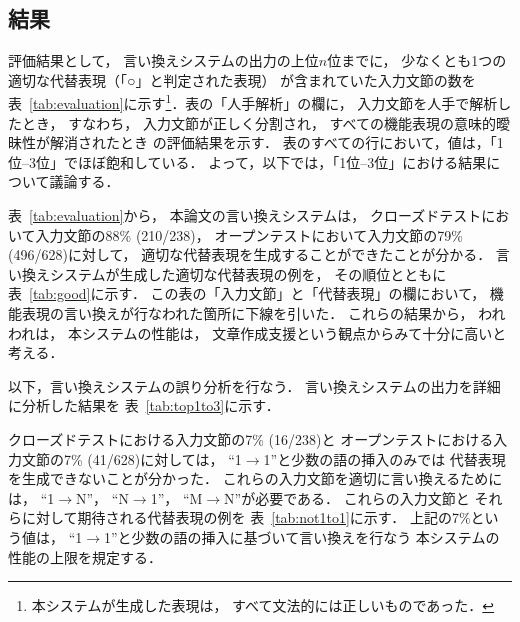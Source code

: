 \documentclass[japanese]{jnlp_1.4}
\begin{document}
\subsection{結果}

評価結果として，
言い換えシステムの出力の上位$n$位までに，
少なくとも1つの適切な代替表現（「○」と判定された表現）
が含まれていた入力文節の数を
表~\ref{tab:evaluation}に示す\footnote{
	本システムが生成した表現は，
	すべて文法的には正しいものであった．
}．表の「人手解析」の欄に，
入力文節を人手で解析したとき，
すなわち，
入力文節が正しく分割され，
すべての機能表現の意味的曖昧性が解消されたとき
の評価結果を示す．
表のすべての行において，値は，「1位--3位」でほぼ飽和している．
よって，以下では，「1位--3位」における結果について議論する．

表~\ref{tab:evaluation}から，
本論文の言い換えシステムは，
クローズドテストにおいて入力文節の88\% (210/238)，
オープンテストにおいて入力文節の79\% (496/628)に対して，
適切な代替表現を生成することができたことが分かる．
言い換えシステムが生成した適切な代替表現の例を，
その順位とともに表~\ref{tab:good}に示す．
この表の「入力文節」と「代替表現」の欄において，
機能表現の言い換えが行なわれた箇所に下線を引いた．
これらの結果から，
われわれは，
本システムの性能は，
文章作成支援という観点からみて十分に高いと考える．

\begin{table}[b]
\caption{言い換えシステムが生成した適切な代替表現の例}
\label{tab:good}

\end{table}

以下，言い換えシステムの誤り分析を行なう．
言い換えシステムの出力を詳細に分析した結果を
表~\ref{tab:top1to3}に示す．

クローズドテストにおける入力文節の7\% (16/238)と
オープンテストにおける入力文節の7\% (41/628)に対しては，
``1$\rightarrow$1''と少数の語の挿入のみでは
代替表現を生成できないことが分かった．
これらの入力文節を適切に言い換えるためには，
``1$\rightarrow$N''，
``N$\rightarrow$1''，
``M$\rightarrow$N''が必要である．
これらの入力文節と
それらに対して期待される代替表現の例を
表~\ref{tab:not1to1}に示す．
上記の7\%という値は，
``1$\rightarrow$1''と少数の語の挿入に基づいて言い換えを行なう
本システムの性能の上限を規定する．

\begin{table}[t]
\caption{言い換えシステムの出力の詳細分析
（表~\ref{tab:evaluation}の「1位--3位」に対応）}
\label{tab:top1to3}

\end{table}
\begin{table}[t]
\caption{``1$\rightarrow$1''と少数の語の挿入のみでは
代替表現を生成できない文節の例}
\label{tab:not1to1}

\end{table}
\end{document}

